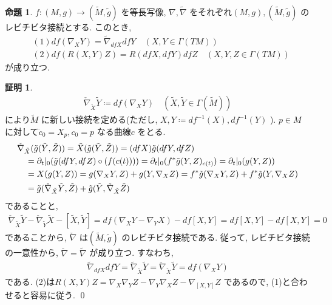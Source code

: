 \documentclass[10pt, fleqn, label-section=none]{bxjsarticle}
\theoremstyle{definition}
\newtheorem{prop}[dfn]{命題}
\newtheorem*{pf*}{証明}
\newcommand{\paren}[1]{\mleft( #1\mright )}
\begin{document}
\begin{prop}
$f: (M,g) \rightarrow (\tilde M, \tilde g)$ を等長写像, $\nabla, \tilde \nabla$ をそれぞれ$(M, g), (\tilde M, \tilde g)$ のレビチビタ接続とする. このとき, 
\begin{align*} &(1)df(\nabla_X Y ) = \tilde \nabla _{dfX} dfY \quad (X, Y \in \Gamma (TM)) \\&(2) df(R(X,Y)Z) = R(dfX,dfY)dfZ \quad (X,Y,Z \in \Gamma(TM) ) \end{align*}
が成り立つ. 
\end{prop}
\begin{pf*}
\begin{align*} \check \nabla _{\tilde X} \tilde Y \coloneqq df(\nabla_X Y) \quad (\tilde X, \tilde Y \in \Gamma(\tilde M) ) \end{align*}
により$\tilde M$ に新しい接続を定める(ただし, $X, Y \coloneqq df^{-1} (X), df^{-1} (Y) $ ).  $p \in M$ に対して$\dot c_0 = X_p , c_0 = p$ なる曲線$c$ をとる. 
\begin{align*} &\check{\nabla}_{\tilde X} (\tilde g (\tilde Y, \tilde Z)) = \tilde X (\tilde g (\tilde Y, \tilde Z)) = (dfX) \tilde g (dfY, dfZ) \\
& \quad = \partial_t|_0 \paren{\tilde g (dfY, dfZ) \circ (f(c(t))) } = \partial_t | _0 (f^* \tilde g (Y,Z) _{c(t)}) = \partial_t |_0 (g(Y,Z)) \\
&\quad = X(g(Y,Z)) = g(\nabla_X Y, Z ) + g(Y, \nabla_X Z) = f^* \tilde g (\nabla_X Y, Z)+ f^* \tilde g (Y, \nabla_X Z) \\& \quad = \tilde g (\check{\nabla}_{\tilde X} \tilde Y, \tilde Z) + \tilde g (\tilde Y, \check{\nabla}_{\tilde X} \tilde Z)  \end{align*}
であることと, 
\begin{align*} \check{\nabla} _{\tilde X} \tilde Y -  \check{\nabla} _{\tilde Y} \tilde X -  [\tilde X, \tilde Y] = df(\nabla_X Y - \nabla_Y X) - df[X,Y] = df[X,Y] - df[X,Y] = 0\end{align*}
であることから, $\check \nabla$ は$(\tilde M , \tilde g)$ のレビチビタ接続である. 従って, レビチビタ接続の一意性から, $\check \nabla = \tilde \nabla$ が成り立つ. すなわち, 
\begin{align*} \tilde{\nabla}_{dfX} dfY =  \tilde{\nabla}_{\tilde X} \tilde Y = \check{\nabla}_{\tilde X} \tilde Y = df(\nabla_X Y) \end{align*}
である. (2)は$R(X,Y)Z = \nabla_X \nabla_Y Z - \nabla_Y \nabla_X Z - \nabla_{[X,Y]}Z$ であるので, (1)と合わせると容易に従う. 
\qed
\end{pf*}
\end{document}
